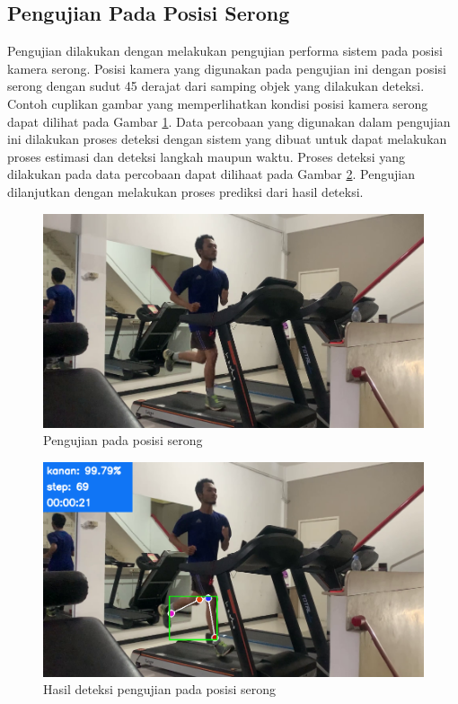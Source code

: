 \subsection{Pengujian Pada Posisi Serong}
\label{subsec:PengujianPosisiSerong}

Pengujian dilakukan dengan melakukan pengujian performa sistem pada posisi kamera serong. Posisi kamera yang digunakan pada pengujian ini dengan posisi serong dengan sudut 45 derajat dari samping objek yang dilakukan deteksi. Contoh cuplikan gambar yang memperlihatkan kondisi posisi kamera serong dapat dilihat pada Gambar \ref{fig:PengujianPosisiSerong}. Data percobaan yang digunakan dalam pengujian ini dilakukan proses deteksi dengan sistem yang dibuat untuk dapat melakukan proses estimasi dan deteksi langkah maupun waktu. Proses deteksi yang dilakukan pada data percobaan dapat dilihaat pada Gambar \ref{fig:PengujianPosisiSerong2}. Pengujian dilanjutkan dengan melakukan proses prediksi dari hasil deteksi.

\begin{figure}[H]
  \centering
  \includegraphics[scale=0.5]{gambar/posisi_serong.png}
  \caption{Pengujian pada posisi serong}
  \label{fig:PengujianPosisiSerong}
\end{figure}

\begin{figure}[H]
  \centering
  \includegraphics[scale=0.5]{gambar/posisi_serong2.png}
  \caption{Hasil deteksi pengujian pada posisi serong}
  \label{fig:PengujianPosisiSerong2}
\end{figure}

